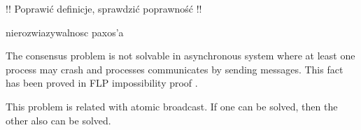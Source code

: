 !! Poprawić definicje, sprawdzić poprawność !!


nierozwiazywalnosc paxos'a

The consensus problem is not solvable in asynchronous system where at least one process may crash and processes communicates by sending messages. This fact has been proved in FLP impossibility proof \cite{FLP}. 

This problem is related with atomic broadcast. If one can be solved, then the other also can be solved.
